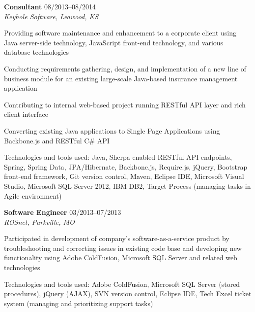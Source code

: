 \begin{itemize1}
	\item \textbf{Consultant} \textopenbullet{} 08/2013--08/2014 \\
		\textit{Keyhole Software, Leawood, KS} \vspace{-1.5mm}
		\begin{itemize1}
			\item Providing software maintenance and enhancement to a corporate client using Java server-side technology, JavaScript front-end technology, and various database technologies
			\item Conducting requirements gathering, design, and implementation of a new line of business module for an existing large-scale Java-based insurance management application
			\item Contributing to internal web-based project running RESTful API layer and rich client interface
			\item Converting existing Java applications to Single Page Applications using Backbone.js and RESTful C\# API
			\item Technologies and tools used: Java, Sherpa enabled RESTful API endpoints, Spring, Spring Data, JPA/Hibernate, Backbone.js, Require.js, jQuery, Bootstrap front-end framework, Git version control, Maven, Eclipse IDE, Microsoft Visual Studio, Microsoft SQL Server 2012, IBM DB2, Target Process (managing tasks in Agile environment)
		\end{itemize1}
\end{itemize1}

\begin{itemize1}
	\item \textbf{Software Engineer} \textopenbullet{} 03/2013--07/2013 \\
		\textit{ROSnet, Parkville, MO} \vspace{-1.5mm}
		\begin{itemize1}
			\item Participated in development of company's software-as-a-service product by troubleshooting and correcting issues in existing code base and developing new functionality using Adobe ColdFusion, Microsoft SQL Server and related web technologies
			\item Technologies and tools used: Adobe ColdFusion, Microsoft SQL Server (stored procedures), jQuery (AJAX), SVN version control, Eclipse IDE, Tech Excel ticket system (managing and prioritizing support tasks)
		\end{itemize1}
\end{itemize1}

